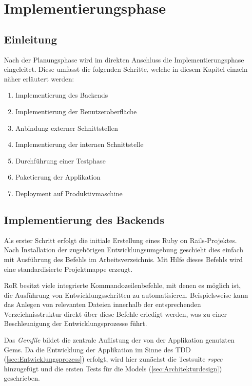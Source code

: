 
\section{Implementierungsphase}
\label{sec:Implementierungsphase}

\subsection{Einleitung}
\label{sec:Einleitung}
Nach der Planungsphase wird im direkten Anschluss die Implementierungsphase eingeleitet. Diese
umfasst die folgenden Schritte, welche in diesem Kapitel einzeln näher erläutert werden:
\begin{enumerate}
	\item Implementierung des Backends
	\item Implementierung der Benutzeroberfläche
	\item Anbindung externer Schnittstellen
	\item Implementierung der internen Schnittstelle
	\item Durchführung einer Testphase
	\item Paketierung der Applikation
	\item Deployment auf Produktivmaschine
\end{enumerate}

\subsection{Implementierung des Backends}
\label{sec:Implementierung des Backends}
Als erster Schritt erfolgt die initiale Erstellung eines Ruby on Rails-Projektes.
Nach Installation der zugehörigen Entwicklungsumgebung geschieht dies einfach mit Ausführung des
Befehls  im Arbeitsverzeichnis. Mit Hilfe dieses Befehls wird eine
standardisierte Projektmappe erzeugt.

RoR besitzt viele integrierte Kommandozeilenbefehle, mit denen es
möglich ist, die Ausführung von
Entwicklungsschritten zu automatisieren. Beispielsweise kann das Anlegen
von relevanten Dateien innerhalb der entsprechenden Verzeichnisstruktur
direkt über diese Befehle erledigt werden, was zu einer Beschleunigung
der Entwicklungsprozesse führt.

Das \textit{Gemfile} bildet die zentrale Auflistung der von der Applikation genutzten Gems. Da die
Entwicklung der Applikation im Sinne des \acs{TDD} (\Vgl \ref{sec:Entwicklungsprozess}) erfolgt,
wird hier zunächst die Testsuite \textit{rspec} hinzugefügt und die ersten Tests für die Models
(\Vgl \ref{sec:Architekturdesign}) geschrieben.

